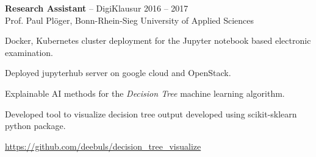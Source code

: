 \documentclass{article}
\newcommand{\employer}[4]{{
\vspace*{2pt}%
\textbf{#1} #2 \hfill #3\\ #4 \vspace*{2pt}}
}
\renewcommand{\labelitemii}{
	\raisebox{0.3ex}{\tiny\textbullet}
}
\newenvironment{bullet-list-minor}{
\begin{list}{\labelitemii}{\setlength\leftmargin{15pt} 
\topsep 0pt \itemsep -2pt}}{\vspace*{4pt}\end{list}
}
\begin{document}
    \employer{Research Assistant}{-- DigiKlausur}{2016 -- 2017}
    {Prof. Paul Pl\"{o}ger, Bonn-Rhein-Sieg University of Applied Sciences}
    \begin{bullet-list-minor}
\item Docker, Kubernetes cluster deployment for the Jupyter notebook based electronic examination.
\item Deployed jupyterhub server on google cloud and OpenStack.


    \item Explainable AI methods for the \emph{Decision Tree} machine learning algorithm.
    \item Developed tool to visualize decision tree output developed using scikit-sklearn python package.
    \item \url{https://github.com/deebuls/decision\_tree\_visualize}
    \end{bullet-list-minor}
\end{document}
